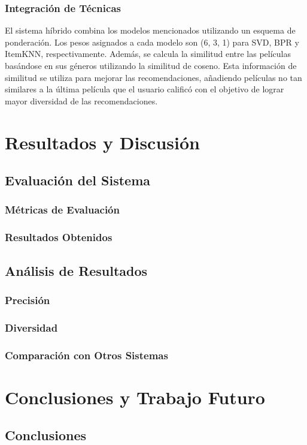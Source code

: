 \documentclass[a4paper,12pt]{report}
\begin{document}
\subsection{Integración de Técnicas}
El sistema híbrido combina los modelos mencionados utilizando un esquema de ponderación. Los pesos asignados a cada modelo son (6, 3, 1) para SVD, BPR y ItemKNN, respectivamente. Además, se calcula la similitud entre las películas basándose en sus géneros utilizando la similitud de coseno. Esta información de similitud se utiliza para mejorar las recomendaciones, añadiendo películas no tan similares a la última película que el usuario calificó con el objetivo de lograr mayor diversidad de las recomendaciones.
\chapter{Resultados y Discusión}
    \section{Evaluación del Sistema}
        \subsection{Métricas de Evaluación}
        \subsection{Resultados Obtenidos}
    \section{Análisis de Resultados}
        \subsection{Precisión}
        \subsection{Diversidad}
        \subsection{Comparación con Otros Sistemas}

\chapter{Conclusiones y Trabajo Futuro}
    \section{Conclusiones}
\end{document}
